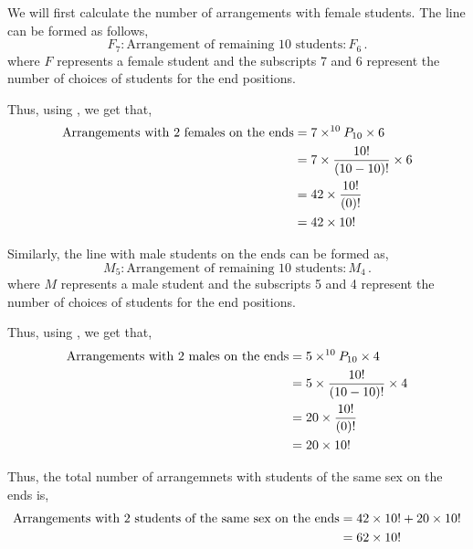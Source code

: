 \begin{subquestions}
\begin{subsubquestions}

\subsubquestion

We will first calculate the number of arrangements with female students. The line can be formed as follows,
\begin{equation}
	F_7 : \text{Arrangement of remaining 10 students} : F_6 \,.
\end{equation}
where $F$ represents a female student and the subscripts 7 and 6 represent the number of choices of students for the end positions.

Thus, using , we get that,
\begin{align}
	\text{Arrangements with 2 females on the ends} & = 7 \times ^{10}P_{10} \times 6 \nonumber \\
	                                          & = 7 \times \frac{10!}{(10-10)!} \times 6 \nonumber \\
	                                          & = 42 \times \frac{10!}{(0)!} \nonumber \\
	                                          & = 42 \times 10! 
\end{align}

Similarly, the line with male students on the ends can be formed as,
\begin{equation}
	M_5 : \text{Arrangement of remaining 10 students} : M_4 \,.
\end{equation}
where $M$ represents a male student and the subscripts 5 and 4 represent the number of choices of students for the end positions.

Thus, using , we get that,
\begin{align}
	\text{Arrangements with 2 males on the ends} & = 5 \times ^{10}P_{10} \times 4 \nonumber \\
	& = 5 \times \frac{10!}{(10-10)!} \times 4 \nonumber \\
	& = 20 \times \frac{10!}{(0)!} \nonumber \\
	& = 20 \times 10! 
\end{align}

Thus, the total number of arrangemnets with students of the same sex on the ends is,
\begin{align}
	\text{Arrangements with 2 students of the same sex on the ends} & = 42 \times 10! + 20 \times 10! \nonumber \\
	                                                & = 62 \times 10! 
\end{align}


\end{subsubquestions}
\end{subquestions}
